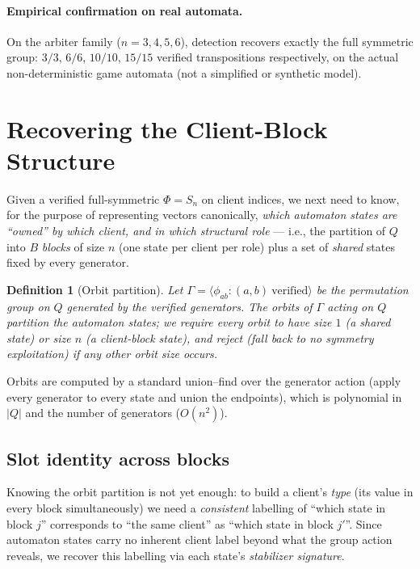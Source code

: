 \documentclass[11pt]{article}
\newtheorem{definition}{Definition}
\newcommand{\Q}{Q}
\newcommand{\Phigroup}{\Phi}
\begin{document}
\paragraph{Empirical confirmation on real automata.} On the arbiter family
($n=3,4,5,6$), detection recovers exactly the full symmetric group: $3/3$,
$6/6$, $10/10$, $15/15$ verified transpositions respectively, on the actual
non-deterministic game automata (not a simplified or synthetic model).

\section{Recovering the Client-Block Structure}
\label{sec:blocks}

Given a verified full-symmetric $\Phigroup = S_n$ on client indices, we
next need to know, for the purpose of representing vectors canonically,
\emph{which automaton states are ``owned'' by which client, and in which
structural role} --- i.e., the partition of $\Q$ into $B$ \emph{blocks} of
size $n$ (one state per client per role) plus a set of \emph{shared} states
fixed by every generator.

\begin{definition}[Orbit partition]
Let $\Gamma = \langle \phi_{ab} : (a,b)\ \text{verified} \rangle$ be the
permutation group on $\Q$ generated by the verified generators. The orbits
of $\Gamma$ acting on $\Q$ partition the automaton states; we require every
orbit to have size $1$ (a \emph{shared} state) or size $n$ (a
\emph{client-block} state), and reject (fall back to no symmetry
exploitation) if any other orbit size occurs.
\end{definition}

Orbits are computed by a standard union--find over the generator action
(apply every generator to every state and union the endpoints), which is
polynomial in $|\Q|$ and the number of generators ($O(n^2)$).

\subsection{Slot identity across blocks}

Knowing the orbit partition is not yet enough: to build a client's
\emph{type} (its value in every block simultaneously) we need a
\emph{consistent} labelling of ``which state in block $j$'' corresponds to
``the same client'' as ``which state in block $j'$''. Since automaton
states carry no inherent client label beyond what the group action
reveals, we recover this labelling via each state's \emph{stabilizer
signature}.
\end{document}
